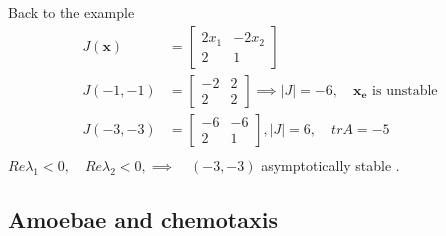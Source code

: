 \documentclass{article}
\theoremstyle{remark}
\begin{document}
  Back to the example  \[
    \begin{split}
  J\left( \mathbf{x} \right)  & = \begin{bmatrix} 
  2x_{1}  &  -2x_{2} \\
  2 &  1
  \end{bmatrix}  \\
  J\left( -1, -1 \right) &=  \begin{bmatrix} 
  -2  &  2 \\
  2  &  2
  \end{bmatrix} 
  \implies  \left\lvert J \right\rvert  = -6 , \quad  \mathbf{x_{e}} \text{ is unstable} 
   \\
   J\left( -3, -3 \right) &=  \begin{bmatrix} 
   -6  &  -6 \\
   2  &  1
   \end{bmatrix} 
   , \left\lvert J \right\rvert  = 6, \quad  tr A = -5 
    \\
    \end{split} 
  \] 
  $Re \lambda _{1} < 0,\quad   Re \lambda _{2} < 0, \implies  \quad  \left( -3, -3 \right)  $  asymptotically stable .

  \subsection{Amoebae and chemotaxis}%
  \label{sub:amoebae_and_cheotaxis}
  
\end{document}
